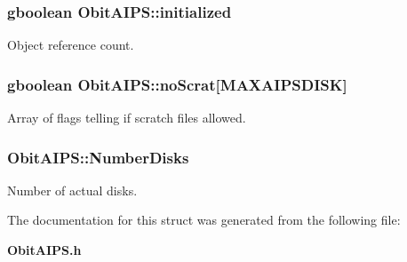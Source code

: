 \subsubsection{\setlength{\rightskip}{0pt plus 5cm}gboolean {\bf Obit\-AIPS::initialized}}\label{structObitAIPS_o1}


Object reference count. 

\subsubsection{\setlength{\rightskip}{0pt plus 5cm}gboolean {\bf Obit\-AIPS::no\-Scrat}[MAXAIPSDISK]}\label{structObitAIPS_o3}


Array of flags telling if scratch files allowed. 

\subsubsection{ {\bf Obit\-AIPS::Number\-Disks}}\label{structObitAIPS_o4}


Number of actual disks. 



The documentation for this struct was generated from the following file:\begin{CompactItemize}
\item 
{\bf Obit\-AIPS.h}\end{CompactItemize}
